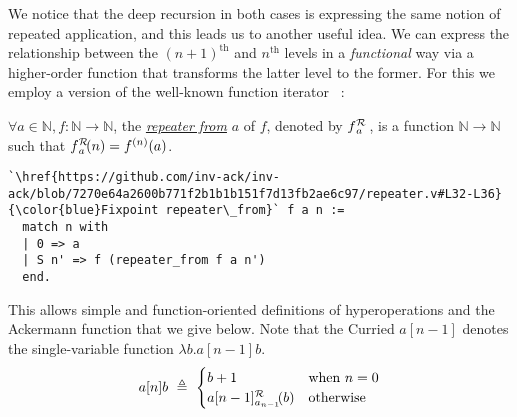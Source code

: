 We notice that the deep recursion in both cases is expressing the same notion
of repeated application, and this leads us to another useful idea. We can express the relationship
between the $(n+1)^{\text{th}}$ and $n^{\text{th}}$ levels in
a \emph{functional} way via a higher-order function that transforms the latter level
to the former. For this we employ a version of the well-known function iterator
~\cite{bertotcast}:
\begin{defn}
$\forall a\in \mathbb{N}, f: \mathbb{N}\to \mathbb{N}$, the
\href{https://github.com/inv-ack/inv-ack/blob/7270e64a2600b771f2b1b1b151f7d13fb2ae6c97/repeater.v#L32-L36}{\color{blue}\emph{repeater from}}
$a$ of $f$, denoted by $\rf{f}{a}$ , is a function $\mathbb{N}\to \mathbb{N}$ such that $\rf{f}{a}(n) = f^{(n)}(a)$.
\begin{lstlisting}
`\href{https://github.com/inv-ack/inv-ack/blob/7270e64a2600b771f2b1b1b151f7d13fb2ae6c97/repeater.v#L32-L36}{\color{blue}Fixpoint repeater\_from}` f a n :=
  match n with
  | 0 => a
  | S n' => f (repeater_from f a n') 
  end.
\end{lstlisting}
\end{defn}
\noindent This allows simple and function-oriented definitions of hyperoperations and the
Ackermann function that we give below. Note that the Curried $a[n-1]$ denotes
the single-variable function $\lambda b.a[n-1]b$.
\begin{equation*}
a[n]b ~ \triangleq ~ \begin{cases}
b + 1 & \text{when } n = 0 \\
\rf{a[n-1]}{a_{n-1}}(b) & \text{otherwise}
\end{cases}
\end{equation*}
